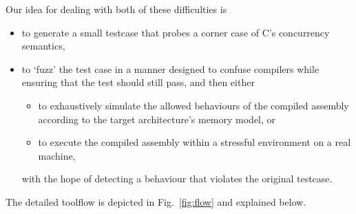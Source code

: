 \documentclass[acmsmall,review]{acmart}
\begin{document}
Our idea for dealing with both of these difficulties is
\begin{itemize}

\item to generate a small testcase that probes a corner case of C's concurrency semantics,
\item to `fuzz' the test case in a manner designed to confuse compilers while ensuring that the test should still pass, and then either
\begin{itemize}
\item to exhaustively simulate the allowed behaviours of the compiled assembly according to the target architecture's memory model, or
\item to execute the compiled assembly within a stressful environment on a real machine,
\end{itemize}
with the hope of detecting a behaviour that violates the original testcase.
\end{itemize}

The detailed toolflow is depicted in Fig.~\ref{fig:flow} and explained below.
\end{document}
